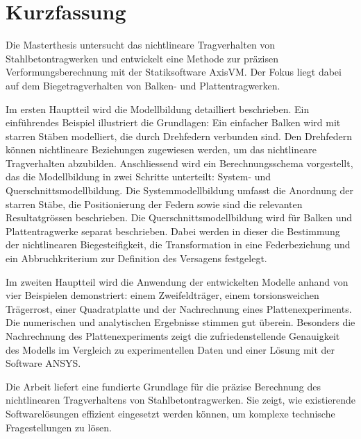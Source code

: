 \chapter*{Kurzfassung}

Die Masterthesis untersucht das nichtlineare Tragverhalten von Stahlbetontragwerken und entwickelt eine Methode zur präzisen Verformungsberechnung mit der Statiksoftware AxisVM. Der Fokus liegt dabei auf dem Biegetragverhalten von Balken- und Plattentragwerken.

Im ersten Hauptteil wird die Modellbildung detailliert beschrieben. Ein einführendes Beispiel illustriert die Grundlagen: Ein einfacher Balken wird mit starren Stäben modelliert, die durch Drehfedern verbunden sind. Den Drehfedern können nichtlineare Beziehungen zugewiesen werden, um das nichtlineare Tragverhalten abzubilden. Anschliessend wird ein Berechnungsschema vorgestellt, das die Modellbildung in zwei Schritte unterteilt: System- und Querschnittsmodellbildung. Die Systemmodellbildung umfasst die Anordnung der starren Stäbe, die Positionierung der Federn sowie sind die relevanten Resultatgrössen beschrieben. Die Querschnittsmodellbildung wird für Balken und Plattentragwerke separat beschrieben. Dabei werden in dieser die Bestimmung der nichtlinearen Biegesteifigkeit, die Transformation in eine Federbeziehung und ein Abbruchkriterium zur Definition des Versagens festgelegt.

Im zweiten Hauptteil wird die Anwendung der entwickelten Modelle anhand von vier Beispielen demonstriert: einem Zweifeldträger, einem torsionsweichen Trägerrost, einer Quadratplatte und der Nachrechnung eines Plattenexperiments. Die numerischen und analytischen Ergebnisse stimmen gut überein. Besonders die Nachrechnung des Plattenexperiments zeigt die zufriedenstellende Genauigkeit des Modells im Vergleich zu experimentellen Daten und einer Lösung mit der Software ANSYS.

Die Arbeit liefert eine fundierte Grundlage für die präzise Berechnung des nichtlinearen Tragverhaltens von Stahlbetontragwerken. Sie zeigt, wie existierende Softwarelösungen effizient eingesetzt werden können, um komplexe technische Fragestellungen zu lösen.